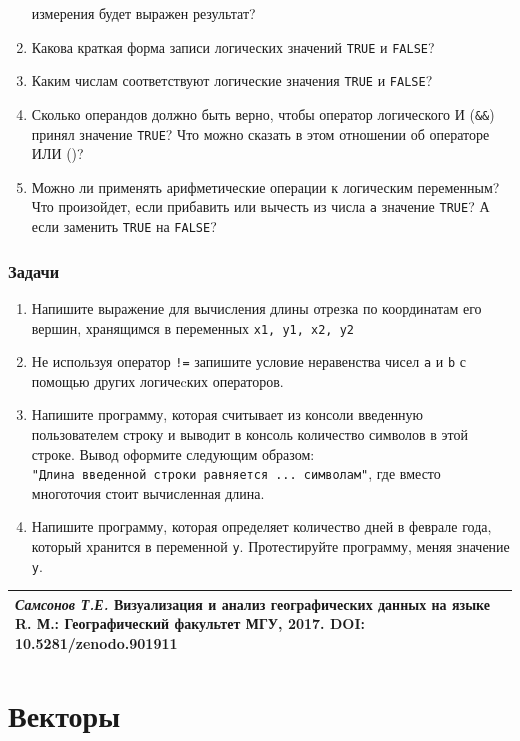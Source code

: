 \documentclass[]{book}
\begin{document}
\begin{enumerate}
  измерения будет выражен результат?
\item
  Какова краткая форма записи логических значений \texttt{TRUE} и
  \texttt{FALSE}?
\item
  Каким числам соответствуют логические значения \texttt{TRUE} и
  \texttt{FALSE}?
\item
  Сколько операндов должно быть верно, чтобы оператор логического И
  (\texttt{\&\&}) принял значение \texttt{TRUE}? Что можно сказать в
  этом отношении об операторе ИЛИ (\texttt{\textbar{}\textbar{}})?
\item
  Можно ли применять арифметические операции к логическим переменным?
  Что произойдет, если прибавить или вычесть из числа \texttt{a}
  значение \texttt{TRUE}? А если заменить \texttt{TRUE} на
  \texttt{FALSE}?
\end{enumerate}

\subsection{Задачи}\label{tasks_basics}

\begin{enumerate}
\def\labelenumi{\arabic{enumi}.}
\item
  Напишите выражение для вычисления длины отрезка по координатам его
  вершин, хранящимся в переменных \texttt{x1,\ y1,\ x2,\ y2}
\item
  Не используя оператор \texttt{!=} запишите условие неравенства чисел
  \texttt{a} и \texttt{b} с помощью других логичеcких операторов.
\item
  Напишите программу, которая считывает из консоли введенную
  пользователем строку и выводит в консоль количество символов в этой
  строке. Вывод оформите следующим образом:
  \texttt{"Длина\ введенной\ строки\ равняется\ ...\ символам"}, где
  вместо многоточия стоит вычисленная длина.
\item
  Напишите программу, которая определяет количество дней в феврале года,
  который хранится в переменной \texttt{y}. Протестируйте программу,
  меняя значение \texttt{y}.
\end{enumerate}

\begin{longtable}[]{@{}l@{}}
\toprule
\emph{Самсонов Т.Е.} \textbf{Визуализация и анализ географических данных
на языке R.} М.: Географический факультет МГУ, 2017. DOI:
10.5281/zenodo.901911\tabularnewline
\bottomrule
\end{longtable}

\chapter{Векторы}\label{vectors}
\end{document}
